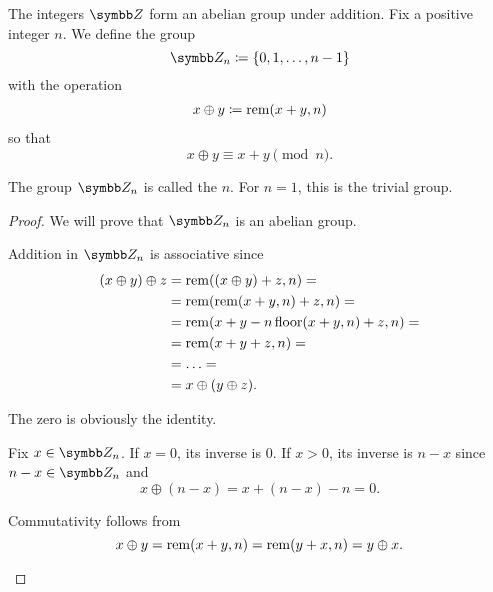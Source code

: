 \begin{definition}\label{def:group_of_integers_modulo}
  The integers \( \Z \) form an abelian group under addition. Fix a positive integer \( n \). We define the group
  \begin{equation*}
    \Z_n \coloneqq \{ 0, 1, \ldots, n - 1 \}
  \end{equation*}
  with the operation
  \begin{align*}
    x \oplus y \coloneqq \operatorname{rem}(x + y, n)
  \end{align*}
  so that
  \begin{equation*}
    x \oplus y \equiv x + y \pmod n.
  \end{equation*}

  The group \( \Z_n \) is called the  \( n \). For \( n = 1 \), this is the trivial group.
\end{definition}
\begin{proof}
  We will prove that \( \Z_n \) is an abelian group.

  \begin{description}
     Addition in \( \Z_n \) is associative since
    \begin{align*}
      (x \oplus y) \oplus z
      &=
      \operatorname{rem}((x \oplus y) + z, n)
      = \\ &=
      \operatorname{rem}(\operatorname{rem}(x + y, n) + z, n)
      = \\ &=
      \operatorname{rem}(x + y - n \operatorname{floor}(x + y, n) + z, n)
      = \\ &=
      \operatorname{rem}(x + y + z, n)
      = \\ &=
      \ldots
      = \\ &=
      x \oplus (y \oplus z).
    \end{align*}

     The zero is obviously the identity.

     Fix \( x \in \Z_n \). If \( x = 0 \), its inverse is \( 0 \). If \( x > 0 \), its inverse is \( n - x \) since \( n - x \in \Z_n \) and
    \begin{equation*}
      x \oplus (n - x) = x + (n - x) - n = 0.
    \end{equation*}

     Commutativity follows from
    \begin{equation*}
      x \oplus y
      =
      \operatorname{rem}(x + y, n)
      =
      \operatorname{rem}(y + x, n)
      =
      y \oplus x.
    \end{equation*}
  \end{description}
\end{proof}

